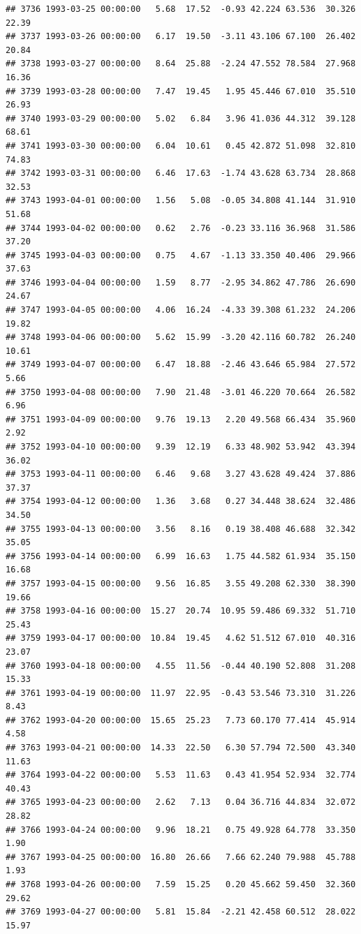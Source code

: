 \documentclass{article}\usepackage{graphicx, color}
\makeatletter
\newenvironment{kframe}{%
 \def\at@end@of@kframe{}%
 \ifinner\ifhmode%
  \def\at@end@of@kframe{\end{minipage}}%
  \begin{minipage}{\columnwidth}%
 \fi\fi%
 \def\FrameCommand##1{\hskip\@totalleftmargin \hskip-\fboxsep
 \colorbox{shadecolor}{##1}\hskip-\fboxsep
     \hskip-\linewidth \hskip-\@totalleftmargin \hskip\columnwidth}%
 \MakeFramed {\advance\hsize-\width
   \@totalleftmargin\z@ \linewidth\hsize
   \@setminipage}}%
 {\par\unskip\endMakeFramed%
 \at@end@of@kframe}
\newenvironment{knitrout}{}{} %
\makeatother
\begin{document}
\begin{knitrout}
\begin{kframe}
\begin{verbatim}
## 3736 1993-03-25 00:00:00   5.68  17.52  -0.93 42.224 63.536  30.326  22.39
## 3737 1993-03-26 00:00:00   6.17  19.50  -3.11 43.106 67.100  26.402  20.84
## 3738 1993-03-27 00:00:00   8.64  25.88  -2.24 47.552 78.584  27.968  16.36
## 3739 1993-03-28 00:00:00   7.47  19.45   1.95 45.446 67.010  35.510  26.93
## 3740 1993-03-29 00:00:00   5.02   6.84   3.96 41.036 44.312  39.128  68.61
## 3741 1993-03-30 00:00:00   6.04  10.61   0.45 42.872 51.098  32.810  74.83
## 3742 1993-03-31 00:00:00   6.46  17.63  -1.74 43.628 63.734  28.868  32.53
## 3743 1993-04-01 00:00:00   1.56   5.08  -0.05 34.808 41.144  31.910  51.68
## 3744 1993-04-02 00:00:00   0.62   2.76  -0.23 33.116 36.968  31.586  37.20
## 3745 1993-04-03 00:00:00   0.75   4.67  -1.13 33.350 40.406  29.966  37.63
## 3746 1993-04-04 00:00:00   1.59   8.77  -2.95 34.862 47.786  26.690  24.67
## 3747 1993-04-05 00:00:00   4.06  16.24  -4.33 39.308 61.232  24.206  19.82
## 3748 1993-04-06 00:00:00   5.62  15.99  -3.20 42.116 60.782  26.240  10.61
## 3749 1993-04-07 00:00:00   6.47  18.88  -2.46 43.646 65.984  27.572   5.66
## 3750 1993-04-08 00:00:00   7.90  21.48  -3.01 46.220 70.664  26.582   6.96
## 3751 1993-04-09 00:00:00   9.76  19.13   2.20 49.568 66.434  35.960   2.92
## 3752 1993-04-10 00:00:00   9.39  12.19   6.33 48.902 53.942  43.394  36.02
## 3753 1993-04-11 00:00:00   6.46   9.68   3.27 43.628 49.424  37.886  37.37
## 3754 1993-04-12 00:00:00   1.36   3.68   0.27 34.448 38.624  32.486  34.50
## 3755 1993-04-13 00:00:00   3.56   8.16   0.19 38.408 46.688  32.342  35.05
## 3756 1993-04-14 00:00:00   6.99  16.63   1.75 44.582 61.934  35.150  16.68
## 3757 1993-04-15 00:00:00   9.56  16.85   3.55 49.208 62.330  38.390  19.66
## 3758 1993-04-16 00:00:00  15.27  20.74  10.95 59.486 69.332  51.710  25.43
## 3759 1993-04-17 00:00:00  10.84  19.45   4.62 51.512 67.010  40.316  23.07
## 3760 1993-04-18 00:00:00   4.55  11.56  -0.44 40.190 52.808  31.208  15.33
## 3761 1993-04-19 00:00:00  11.97  22.95  -0.43 53.546 73.310  31.226   8.43
## 3762 1993-04-20 00:00:00  15.65  25.23   7.73 60.170 77.414  45.914   4.58
## 3763 1993-04-21 00:00:00  14.33  22.50   6.30 57.794 72.500  43.340  11.63
## 3764 1993-04-22 00:00:00   5.53  11.63   0.43 41.954 52.934  32.774  40.43
## 3765 1993-04-23 00:00:00   2.62   7.13   0.04 36.716 44.834  32.072  28.82
## 3766 1993-04-24 00:00:00   9.96  18.21   0.75 49.928 64.778  33.350   1.90
## 3767 1993-04-25 00:00:00  16.80  26.66   7.66 62.240 79.988  45.788   1.93
## 3768 1993-04-26 00:00:00   7.59  15.25   0.20 45.662 59.450  32.360  29.62
## 3769 1993-04-27 00:00:00   5.81  15.84  -2.21 42.458 60.512  28.022  15.97

\end{verbatim}
\end{kframe}
\end{knitrout}
\end{document}
